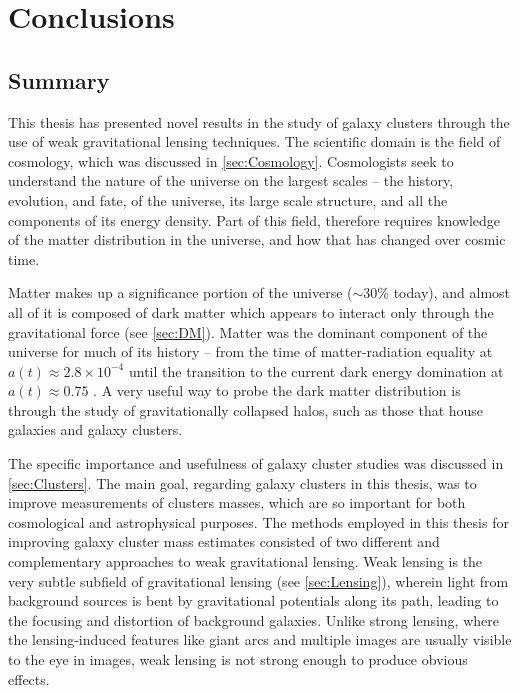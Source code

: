 
\chapter{Conclusions}
\label{ch:conc}


\section{Summary}
\label{sec:summary}

This thesis has presented novel results in the study of galaxy clusters through the use of weak gravitational lensing techniques. The scientific domain is the field of cosmology, which was discussed in \autoref{sec:Cosmology}. Cosmologists seek to understand the nature of the universe on the largest scales -- the history, evolution, and fate, of the universe, its large scale structure, and all the components of its energy density. Part of this field, therefore requires knowledge of the matter distribution in the universe, and how that has changed over cosmic time. 

Matter makes up a significance portion of the universe ($\sim 30$\% today), and almost all of it is composed of dark matter which appears to interact only through the gravitational force (see \autoref{sec:DM}). Matter was the dominant component of the universe for much of its history -- from the time of matter-radiation equality at $a(t) \approx 2.8 \times 10^{-4}$ until the transition to the current dark energy domination at $a(t) \approx 0.75$ \citep{RydenText}. A very useful way to probe the dark matter distribution is through the study of gravitationally collapsed halos, such as those that house galaxies and galaxy clusters.

The specific importance and usefulness of galaxy cluster studies was discussed in \autoref{sec:Clusters}. The main goal, regarding galaxy clusters in this thesis, was to improve measurements of clusters masses, which are so important for both cosmological and astrophysical purposes. The methods employed in this thesis for improving galaxy cluster mass estimates consisted of two different and complementary approaches to weak gravitational lensing. Weak lensing is the very subtle subfield of gravitational lensing (see \autoref{sec:Lensing}), wherein light from background sources is bent by gravitational potentials along its path, leading to the focusing and distortion of background galaxies. Unlike strong lensing, where the lensing-induced features like giant arcs and multiple images are usually visible to the eye in images, weak lensing is not strong enough to produce obvious effects.

